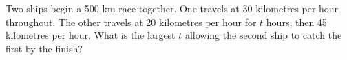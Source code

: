 Two ships begin a 500 km race together. One travels at 30 kilometres per hour throughout. The other travels at 20 kilometres per hour for $ t $ hours, then 45 kilometres per hour. What is the largest $ t $ allowing the second ship to catch the first by the finish?

